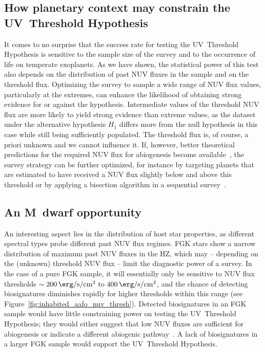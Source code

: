 \documentclass[twocolumn,twocolappendix,linenumbers]{aastex631}
\begin{document}
\subsection{How planetary context may constrain the UV~Threshold Hypothesis} %
It comes to no surprise that the success rate for testing the UV~Threshold Hypothesis is sensitive to the sample size of the survey and to the occurrence of life on temperate exoplanets.
As we have shown, the statistical power of this test also depends on the distribution of past \gls{NUV} fluxes in the sample and on the threshold flux.
Optimizing the survey to sample a wide range of NUV flux values, particularly at the extremes, can enhance the likelihood of obtaining strong evidence for or against the hypothesis.
Intermediate values of the threshold \gls{NUV} flux are more likely to yield strong evidence than extreme values, as the dataset under the alternative hypothesis $H_1$ differs more from the null hypothesis in this case while still being sufficiently populated.
The threshold flux is, of course, a priori unknown and we cannot influence it.
If, however, better theoretical predictions for the required \gls{NUV} flux for abiogenesis become available~\citep{Rimmer2021}, the survey strategy can be further optimized, for instance by targeting planets that are estimated to have received a \gls{NUV} flux slightly below and above this threshold or by applying a bisection algorithm in a sequential survey~\citep{Fields2023}.

\subsection{An M~dwarf opportunity}
An interesting aspect lies in the distribution of host star properties, as different spectral types probe different past \gls{NUV} flux regimes.
FGK stars show a narrow distribution of maximum past \gls{NUV} fluxes in the \gls{HZ}, which may -- depending on the (unknown) threshold \gls{NUV} flux -- limit the diagnostic power of a survey.
In the case of a pure FGK sample, it will essentially only be sensitive to \gls{NUV} flux thresholds $\sim \SIrange{200}{400}{\erg\per\second\per\centi\meter\squared}$, and the chance of detecting biosignatures diminishes rapidly for higher thresholds within this range (see Figure~\ref{fig:inhabited_aafo_nuv_thresh}).
Detected biosignatures in an FGK sample would have little constraining power on testing the UV~Threshold Hypothesis; they would either suggest that low NUV fluxes are sufficient for abiogenesis or indicate a different abiogenic pathway~\citep[e.g.,][]{Westall2018}.
A lack of biosignatures in a larger FGK sample would support the UV~Threshold Hypothesis.
\end{document}
